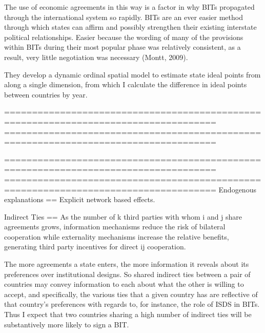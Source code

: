 The use of economic agreements in this way is a factor in why BITs propagated through the international system so rapidly. BITs are an ever easier method through which states can affirm and possibly strengthen their existing interstate political relationships. Easier because the wording of many of the provisions within BITs during their most popular phase was relatively consistent, as a result, very little negotiation was necessary (Montt, 2009).

They develop a dynamic ordinal spatial model to estimate state ideal points from along a single dimension, from which I calculate the difference in ideal points between countries by year.

====================================================================================
====================================================================================

====================================================================================
====================================================================================
Endogenous explanations
==
Explicit network based effects. 

Indirect Ties
==
As the number of k third parties with whom i and j share agreements grows, information mechanisms reduce the risk of bilateral cooperation while externality mechanisms increase the relative benefits, generating third party incentives for direct ij cooperation. 

The more agreements a state enters, the more information it reveals about its preferences over institutional designs. So shared indirect ties between a pair of countries may convey information to each about what the other is willing to accept, and specifically, the various ties that a given country has are reflective of that country’s preferences with regards to, for instance, the role of ISDS in BITs. Thus I expect that two countries sharing a high number of indirect ties will be substantively more likely to sign a BIT.


